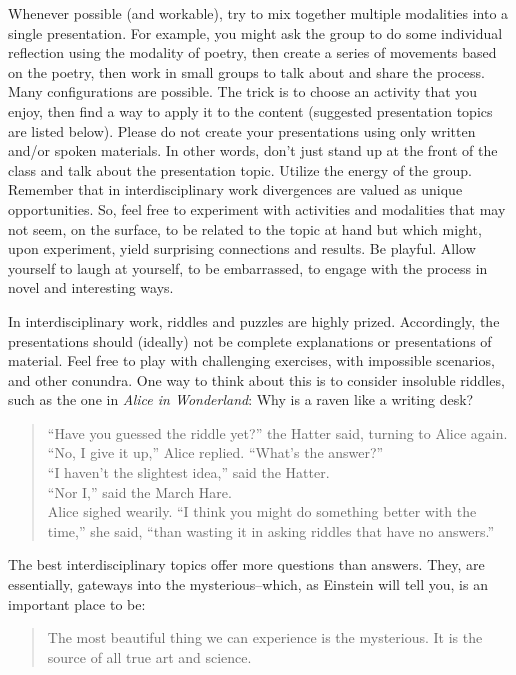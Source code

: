 \documentclass[letterpaper,10pt,headsepline]{scrreprt}
\begin{document}
 Whenever possible (and workable), try to mix together multiple
 modalities into a single presentation. For example, you might ask the
 group to do some individual reflection using the modality of poetry,
 then create a series of movements based on the poetry, then work in
 small groups to talk about and share the process. Many configurations
 are possible. The trick is to choose an activity that you enjoy, then
 find a way to apply it to the content (suggested presentation topics
 are listed below). Please do not create your presentations using only
 written and/or spoken materials. In other words, don't just stand up
 at the front of the class and talk about the presentation topic.
 Utilize the energy of the group. Remember that in interdisciplinary
 work divergences are valued as unique opportunities. So, feel free to
 experiment with activities and modalities that may not seem, on the
 surface, to be related to the topic at hand but which might, upon
 experiment, yield surprising connections and results. Be playful.
 Allow yourself to laugh at yourself, to be embarrassed, to engage
 with the process in novel and interesting ways.

In interdisciplinary work, riddles and puzzles are highly prized.
Accordingly, the presentations should (ideally) not be complete
explanations or presentations of material. Feel free to play with
challenging exercises, with impossible scenarios, and other conundra.
One way to think about this is to consider insoluble riddles, such as
the one in \textit{Alice in Wonderland}: Why is a raven like a
writing desk?

\begin{quote}
  ``Have you guessed the riddle yet?'' the Hatter said, turning to Alice again.\\
``No, I give it up,'' Alice replied. ``What's the answer?''\\
``I haven't the slightest idea,'' said the Hatter.\\
``Nor I,'' said the March Hare.\\
Alice sighed wearily. ``I think you might do something better with the time,'' she said, ``than wasting it in asking riddles that have no answers.''
\end{quote}

The best interdisciplinary topics offer more questions than answers.
They, are essentially, gateways into the mysterious--which, as
Einstein will tell you, is an important place to be:

\begin{quote}
  The most beautiful thing we can experience is the mysterious. It is
  the source of all true art and science.
\end{quote}
\end{document}
